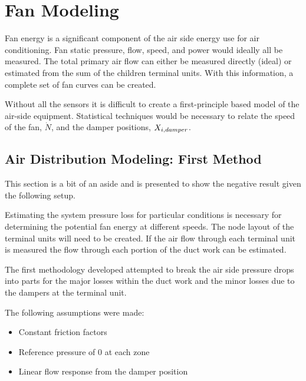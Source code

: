 

\section{Fan Modeling}\label{sec:FanModeling}

Fan energy is a significant component of the air side energy use for air
conditioning. Fan static pressure, flow, speed, and power would ideally
all be measured.  The total primary air flow can either be measured
directly (ideal) or estimated from the sum of the children terminal
units. With this information, a complete set of fan curves can be
created.

Without all the sensors it is difficult to create a first-principle based model
of the air-side equipment. Statistical techniques would be necessary to relate
the speed of the fan, \(\dot N\), and the damper positions,
\(X_{i,damper}\).

\subsection{Air Distribution Modeling: First Method}
This section is a bit of an aside and is presented to show the negative
result given the following setup.

Estimating the system pressure loss for particular conditions is
necessary for determining the potential fan energy at different speeds.
The node layout of the terminal units will need to be created. If the air
flow through each terminal unit is measured the flow through each
portion of the duct work can be estimated.

The first methodology developed attempted to break the air side pressure
drops into parts for the major losses within the duct work and the minor
losses due to the dampers at the terminal unit.

The following assumptions were made:

\begin{itemize}
    \item Constant friction factors
    \item Reference pressure of 0 at each zone
    \item Linear flow response from the damper position
\end{itemize}



